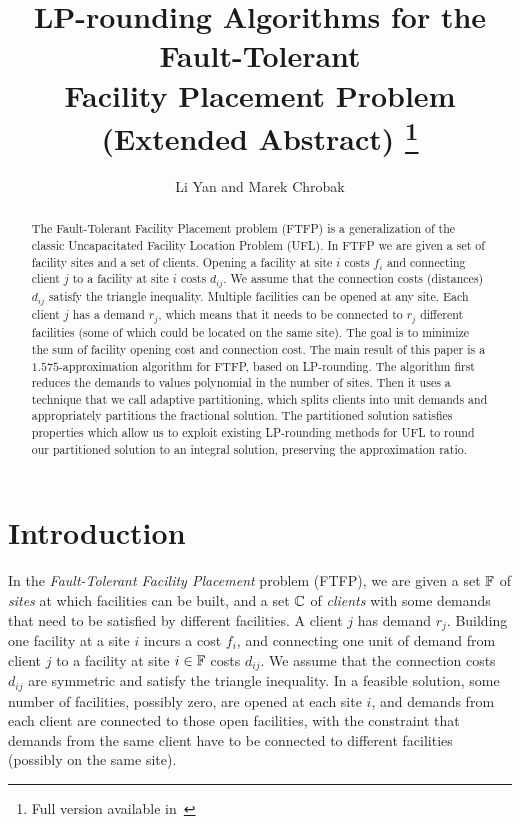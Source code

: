 \documentclass{llncs}
\title{LP-rounding Algorithms for the Fault-Tolerant\\
 		Facility Placement Problem (Extended Abstract)
		\thanks{Full version available in~\cite{YanC12}}
		}
\author{Li Yan and Marek Chrobak}
\institute{Department of Computer Science, University of California at Riverside\\
              \email{\{lyan,marek\}@cs.ucr.edu}}
\date{}
\begin{document}
\maketitle

\begin{abstract} 
  The Fault-Tolerant Facility Placement problem (FTFP) is a
  generalization of the classic Uncapacitated Facility Location
  Problem (UFL). In FTFP we are given a set of facility sites and a
  set of clients. Opening a facility at site $i$ costs $f_i$ and
  connecting client $j$ to a facility at site $i$ costs $d_{ij}$. We
  assume that the connection costs (distances) $d_{ij}$ satisfy the
  triangle inequality. Multiple facilities can be opened at any
  site. Each client $j$ has a demand $r_j$, which means that it needs
  to be connected to $r_j$ different facilities (some of which could
  be located on the same site). The goal is to minimize the sum of
  facility opening cost and connection cost. The main result of this
  paper is a $1.575$-approximation algorithm for FTFP, based on
  LP-rounding. The algorithm first reduces the demands to values
  polynomial in the number of sites. Then it uses a technique that we
  call adaptive partitioning, which splits clients into unit demands
   and appropriately partitions the
fractional solution. The partitioned solution satisfies properties
  which allow us to exploit existing LP-rounding methods for UFL to
  round our partitioned solution to an integral solution, preserving
  the approximation ratio. 
\end{abstract}

\section{Introduction}

In the \emph{Fault-Tolerant Facility Placement} problem
(FTFP), we are given a set $\mathbb{F}$ of \emph{sites} at
which facilities can be built, and a set $\mathbb{C}$ of
\emph{clients} with some demands that need to be satisfied
by different facilities. A client $j$ has demand
$r_j$. Building one facility at a site $i$ incurs a cost
$f_i$, and connecting one unit of demand from client $j$ to
a facility at site $i\in\mathbb{F}$ costs $d_{ij}$.
We assume that the connection costs $d_{ij}$ are
symmetric and satisfy the triangle inequality. In a feasible solution, some
number of facilities, possibly zero, are opened at each site
$i$, and demands from each client are connected to those
open facilities, with the constraint that demands from the
same client have to be connected to different
facilities (possibly on the same site).
\end{document}
